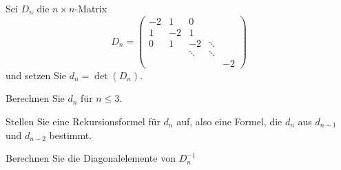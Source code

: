 Sei $D_n$ die $n\times n$-Matrix
\[
D_n=\begin{pmatrix}
-2& 1&     0&      &  \\
 1&-2&     1&      &  \\
 0& 1&    -2&\ddots&  \\
  &  &\ddots&\ddots&  \\
  &  &      &      &-2
\end{pmatrix}
\]
und setzen Sie $d_n=\det(D_n)$.
\begin{teilaufgaben}
\item Berechnen Sie $d_n$ für $n\le 3$.
\item Stellen Sie eine Rekursionsformel für $d_n$ auf, also eine Formel,
die $d_{n}$ aus  $d_{n-1}$ und $d_{n-2}$ bestimmt.
\item Berechnen Sie die Diagonalelemente von $D_n^{-1}$
\end{teilaufgaben}


